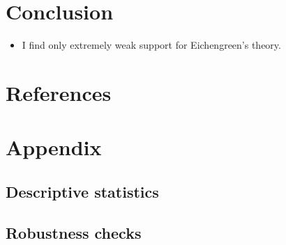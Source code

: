 \documentclass[
]{article}
\providecommand{\tightlist}{%
  \setlength{\itemsep}{0pt}\setlength{\parskip}{0pt}}
\begin{document}
\hypertarget{conclusion}{%
\section{Conclusion}\label{conclusion}}

\begin{itemize}
\tightlist
\item
  I find only extremely weak support for Eichengreen's theory.
\end{itemize}

\hypertarget{references}{%
\section{References}\label{references}}

\FloatBarrier

\hypertarget{appendix}{%
\section{Appendix}\label{appendix}}

\hypertarget{descriptive-statistics}{%
\subsection{Descriptive statistics}\label{descriptive-statistics}}

\hypertarget{robustness-checks}{%
\subsection*{Robustness checks}\label{robustness-checks}}
\end{document}
